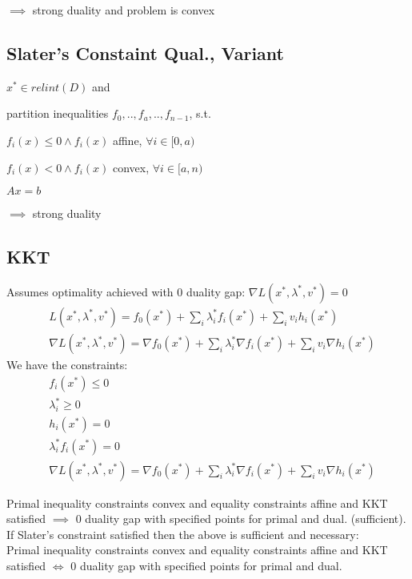 \documentclass[8pt]{extarticle}
\begin{document}
\begin{multicols*}{2}
  $\implies$ strong duality and problem is convex

  \subsection{Slater's Constaint Qual., Variant}
  $x^* \in relint(D)$ and
  
  partition inequalities $f_0, .., f_a, .., f_{n-1}$, s.t.
  
  $f_i(x) \leq 0 \wedge f_i(x)$ affine, $\forall i \in [0,a)$
  
  $f_i(x) < 0 \wedge f_i(x)$ convex, $\forall i \in [a, n)$
  
  $Ax = b$
  
  $\implies$ strong duality
  
  \subsection{KKT}
  Assumes optimality achieved with 0 duality gap: $\nabla L(x^*,\lambda^*,v^*)=0$
  \begin{align*}
    &L(x^*,\lambda^*,v^*) = f_0(x^*) + \sum_i \lambda_i^* f_i(x^*) + \sum_i v_i h_i(x^*)\\
    &\nabla L(x^*,\lambda^*,v^*) = \nabla f_0(x^*) + \sum_i \lambda_i^* \nabla f_i(x^*) + \sum_i v_i \nabla h_i(x^*)
  \end{align*}
  We have the constraints:
  \begin{align*}
    &f_i(x^*) \leq 0\\
    &\lambda_i^* \geq 0\\
    &h_i(x^*)=0\\
    &\lambda_i^* f_i(x^*)=0\\
    &\nabla L(x^*,\lambda^*,v^*) = \nabla f_0(x^*) + \sum_i \lambda_i^* \nabla f_i(x^*) + \sum_i v_i \nabla h_i(x^*)
  \end{align*}

  Primal inequality constraints convex and equality constraints affine and KKT satisfied $\implies$ 0 duality gap with specified points for primal and dual. (sufficient).\\

  If Slater's constraint satisfied then the above is sufficient and necessary:\\
  Primal inequality constraints convex and equality constraints affine and KKT satisfied $\iff$ 0 duality gap with specified points for primal and dual.\\
  
  \vfill\null
  

\end{multicols*}
\end{document}
